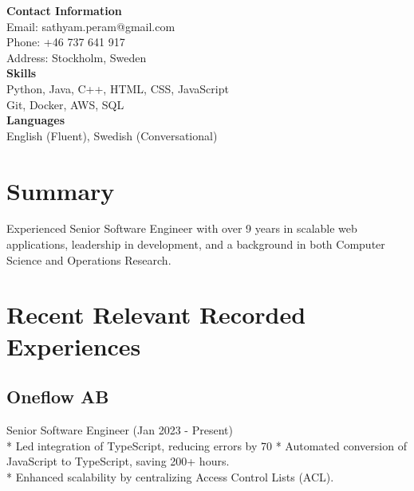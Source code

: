\documentclass[13pt,a4paper,sans,colorlinks,urlcolor=violet,hyperindex,plainpages=false,bookmarksopen,bookmarksnumbered,pdfusetitle]{moderncv}
\begin{document}
\hypersetup{urlcolor=violet}

\vspace{-1em}


\begin{paracol}{2}

\switchcolumn[0] %
\colorbox{sidebarcolor}{%
  \parbox[t][\textheight][t]{\linewidth}{ %
    \vspace{1em} %
    \textbf{Contact Information} \\[0.5em]
    Email: sathyam.peram@gmail.com \\[0.5em]
    Phone: +46 737 641 917 \\[0.5em]
    Address: Stockholm, Sweden \\[1em]

    \textbf{Skills} \\[0.5em]
    Python, Java, C++, HTML, CSS, JavaScript \\[0.5em]
    Git, Docker, AWS, SQL \\[1em]

    \textbf{Languages} \\[0.5em]
    English (Fluent), Swedish (Conversational)
  }
}

\switchcolumn %
\section{Summary}
Experienced Senior Software Engineer with over 9 years in scalable web applications, leadership in development, and a background in both Computer Science and Operations Research.

\vspace{1em}

\section{Recent Relevant Recorded Experiences}
\subsection{Oneflow AB}
Senior Software Engineer (Jan 2023 - Present) \\
* Led integration of TypeScript, reducing errors by 70%
* Automated conversion of JavaScript to TypeScript, saving 200+ hours. \\
* Enhanced scalability by centralizing Access Control Lists (ACL).


\end{paracol}
\end{document}
